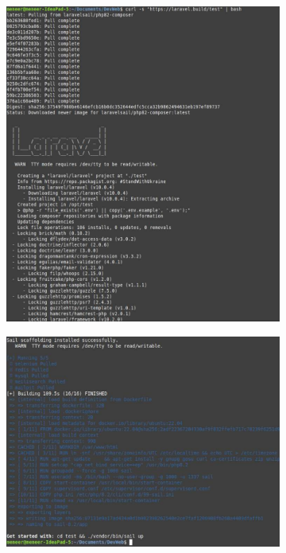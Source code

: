        \begin{figure}[h]
            \centering
            \begin{subfigure}{0.3\textwidth}
                \includegraphics[width=\textwidth]{Images_formation/CreateProject.pdf}
            \end{subfigure}
            \begin{subfigure}{0.3\textwidth}
                \includegraphics[width=\textwidth]{Images_formation/CreateProject2.pdf}
            \end{subfigure}
        \end{figure}

